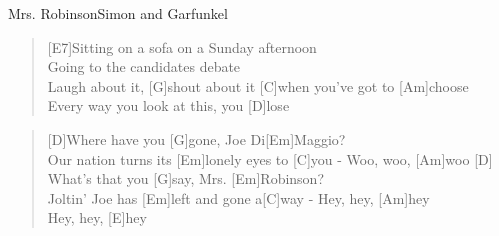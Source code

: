 \begin{song}{Mrs. Robinson}{Simon and Garfunkel}

    \begin{verse}  
        [E7]Sitting on a sofa on a Sunday afternoon \\
        [A7]Going to the candidates debate \\
        [D]Laugh about it, [G]shout about it [C]when you've got to [Am]choose \\
        [E7]Every way you look at this, you [D]lose 
    \end{verse}  


    \begin{verse}  
        [D]Where have you [G]gone, Joe Di[Em]Maggio? \\
        [G]Our nation turns its [Em]lonely eyes to [C]you - Woo, woo, [Am]woo [D] \\
        What's that you [G]say, Mrs. [Em]Robinson? \\
        [G]Joltin' Joe has [Em]left and gone a[C]way - Hey, hey, [Am]hey \\
        Hey, hey, [E]hey
    \end{verse}  

\end{song}
